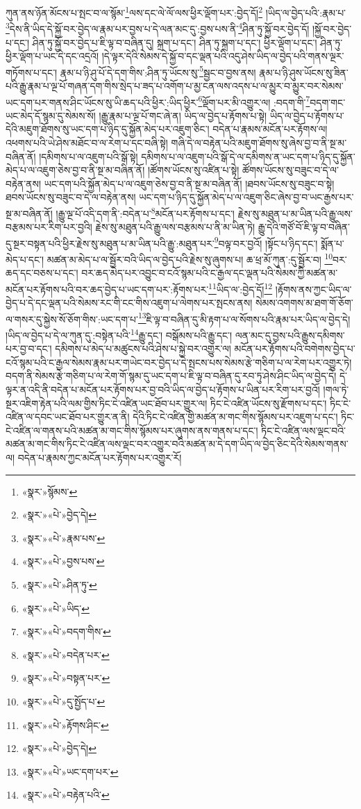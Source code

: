 ཀུན་ནས་ཉོན་མོངས་པ་སྤང་བ་ལ་སྙོམ་\footnote{«སྣར་»སྙོམས་}ལས་དང་ལེ་ལོ་ལས་ཕྱིར་ལྡོག་པར་:བྱེད་དོ།\footnote{«སྣར་»«པེ་»བྱེད་དེ།} །ཡིད་ལ་བྱེད་པའི་:རྣམ་པ་\footnote{«སྣར་»«པེ་»རྣམ་པས་}དེས་ནི་ཡིད་དེ་སྐྱོ་བར་བྱེད་ལ་རྣམ་པར་བྱས་པ་དེ་ལན་མང་དུ་:བྱས་པས་ནི་\footnote{«སྣར་»«པེ་»བྱས་པས་}ཤིན་ཏུ་སྐྱོ་བར་བྱེད་དོ། །སྐྱོ་བར་བྱེད་པ་དང་། ཤིན་ཏུ་སྐྱོ་བར་བྱེད་པ་ཇི་ལྟ་བ་བཞིན་དུ། སྐྲག་པ་དང་། ཤིན་ཏུ་སྐྲག་པ་དང་། ཕྱིར་ལྡོག་པ་དང་། ཤིན་ཏུ་ཕྱིར་ལྡོག་པ་ཡང་དེ་དང་འདྲའོ། །དེ་ལྟར་དེའི་སེམས་དེ་སྐྱོ་བ་དང་ལྡན་པའི་འདུ་ཤེས་ཡིད་ལ་བྱེད་པའི་གནས་ལྔར་གཏོགས་པ་དང་། རྣམ་པ་ཉི་ཤུ་པོ་དེ་དག་གིས་:ཤིན་ཏུ་ཡོངས་སུ་\footnote{«སྣར་»«པེ་»ཤིན་ཏུ་}སྦྱང་བ་བྱས་ནས། རྣམ་པ་ཉི་ཤུས་ཡོངས་སུ་ཟིན་པའི་རྒྱུ་རྣམ་པ་ལྔ་པོ་གཞན་དག་གིས་སྲེད་པ་ཟད་པ་འགོག་པ་མྱ་ངན་ལས་འདས་པ་ལ་མྱུར་བ་མྱུར་བར་སེམས་ཡང་དག་པར་གནས་ཤིང་ཡོངས་སུ་ཡི་ཆད་པའི་ཕྱིར་:ཡིད་ཕྱིར་\footnote{«སྣར་»«པེ་»ཡིད་}ལྡོག་པར་མི་འགྱུར་ལ། :བདག་གི་\footnote{«སྣར་»«པེ་»བདག་གིས་}བདག་གང་ཡང་མེད་དོ་སྙམ་དུ་སེམས་སོ། །རྒྱུ་རྣམ་པ་ལྔ་པོ་གང་ཞེ་ན། ཡིད་ལ་བྱེད་པ་རྟོགས་པ་སྟེ། ཡིད་ལ་བྱེད་པ་རྟོགས་པ་དེའི་མཇུག་ཐོགས་སུ་ཡང་དག་པ་ཉིད་དུ་སྐྱོན་མེད་པར་འཇུག་ཅིང་། བདེན་པ་རྣམས་མངོན་པར་རྟོགས་ལ། འཕགས་པའི་ཡེ་ཤེས་མཐོང་བ་ལ་རེག་པ་དང་བཞི་སྟེ། གཞི་དེ་ལ་བརྟེན་པའི་མཇུག་ཐོགས་སུ་ཞེས་བྱ་བ་ནི་སྔ་མ་བཞིན་ནོ། །དམིགས་པ་ལ་འཇུག་པའི་སྒོ་སྟེ། དམིགས་པ་ལ་འཇུག་པའི་སྒོ་དེ་ལ་དམིགས་ན་ཡང་དག་པ་ཉིད་དུ་སྐྱོན་མེད་པ་ལ་འཇུག་ཅེས་བྱ་བ་ནི་སྔ་མ་བཞིན་ནོ། །ཚོགས་ཡོངས་སུ་འཛིན་པ་སྟེ། ཚོགས་ཡོངས་སུ་བཟུང་བ་དེ་ལ་བརྟེན་ནས། ཡང་དག་པའི་སྐྱོན་མེད་པ་ལ་འཇུག་ཅེས་བྱ་བ་ནི་སྔ་མ་བཞིན་ནོ། །ཐབས་ཡོངས་སུ་བཟུང་བ་སྟེ། ཐབས་ཡོངས་སུ་བཟུང་བ་དེ་ལ་བརྟེན་ནས། ཡང་དག་པ་ཉིད་དུ་སྐྱོན་མེད་པ་ལ་འཇུག་ཅིང་ཞེས་བྱ་བ་ཡང་རྒྱས་པར་སྔ་མ་བཞིན་ནོ། །རྒྱུ་ལྔ་པོ་འདི་དག་ནི་:བདེན་པ་\footnote{«སྣར་»«པེ་»བདེན་པར་}མངོན་པར་རྟོགས་པ་དང་། རྗེས་སུ་མཐུན་པ་མ་ཡིན་པའི་རྒྱུ་ལས་བརྩམས་པར་རིག་པར་བྱའི། རྗེས་སུ་མཐུན་པའི་རྒྱུ་ལས་བརྩམས་པ་ནི་མ་ཡིན་ཏེ། རྒྱུ་དེའི་གཙོ་བོ་ཇི་ལྟ་བ་བཞིན་དུ་སྔར་བསྟན་པའི་ཕྱིར་རྗེས་སུ་མཐུན་པ་མ་ཡིན་པའི་རྒྱུ་:མཐུན་པར་\footnote{«སྣར་»«པེ་»བསྟན་པར་}བལྟ་བར་བྱའོ། །སྟོང་པ་ཉིད་དང་། སྨོན་པ་མེད་པ་དང་། མཚན་མ་མེད་པ་ལ་སྦྱོར་བའི་ཡིད་ལ་བྱེད་པའི་རྗེས་སུ་ཞུགས་པ། ཆ་ཕྲ་མོ་ཀུན་:དུ་སྦྱོར་བ། \footnote{«སྣར་»«པེ་»དུ་སྤྱོད་པ་}བར་ཆད་དང་བཅས་པ་དང་། བར་ཆད་མེད་པར་འབྱུང་བ་ངའོ་སྙམ་པའི་ང་རྒྱལ་དང་ལྡན་པའི་སེམས་ཀྱི་མཚན་མ་མངོན་པར་རྟོགས་པའི་བར་ཆད་བྱེད་པ་ཡང་དག་པར་:རྟོགས་པར་\footnote{«སྣར་»«པེ་»རྟོགས་ཤིང་}ཡིད་ལ་:བྱེད་དོ།\footnote{«སྣར་»«པེ་»བྱེད་དེ།} །རྟོགས་ནས་ཀྱང་ཡིད་ལ་བྱེད་པ་དེ་དང་ལྡན་པའི་སེམས་རང་གི་ངང་གིས་འཇུག་པ་ལེགས་པར་སྤངས་ནས། སེམས་འགགས་མ་ཐག་གོ་ཅོག་ལ་གསར་དུ་སྐྱེས་སོ་ཅོག་གིས་:ཡང་དག་པ་\footnote{«སྣར་»«པེ་»ཡང་དག་པར་}ཇི་ལྟ་བ་བཞིན་དུ་མི་རྟག་པ་ལ་སོགས་པའི་རྣམ་པར་ཡིད་ལ་བྱེད་དེ། །ཡིད་ལ་བྱེད་པ་དེ་ལ་ཀུན་དུ་:བསྟེན་པའི་\footnote{«སྣར་»«པེ་»བརྟེན་པའི་}རྒྱུ་དང་། བསྒོམས་པའི་རྒྱུ་དང་། ལན་མང་དུ་བྱས་པའི་རྒྱུས་དམིགས་པར་བྱ་བ་དང་། དམིགས་པ་མེད་པ་མཚུངས་པའི་ཤེས་པ་སྐྱེ་བར་འགྱུར་ལ། མངོན་པར་རྟོགས་པའི་བགེགས་བྱེད་པ་ངའོ་སྙམ་པའི་ང་རྒྱལ་སེམས་རྣམ་པར་གཡེང་བར་བྱེད་པ་དེ་སྤངས་པས་སེམས་རྩེ་གཅིག་པ་ལ་རེག་པར་འགྱུར་ཏེ། བདག་ནི་སེམས་རྩེ་གཅིག་པ་ལ་རེག་གོ་སྙམ་དུ་ཡང་དག་པ་ཇི་ལྟ་བ་བཞིན་དུ་རབ་ཏུ་ཤེས་ཤིང་ཡིད་ལ་བྱེད་དེ། དེ་ལྟར་ན་འདི་ནི་བདེན་པ་མངོན་པར་རྟོགས་པར་བྱ་བའི་ཡིད་ལ་བྱེད་པ་རྟོགས་པ་ཡིན་པར་རིག་པར་བྱའོ། །གལ་ཏེ་སྔར་འཇིག་རྟེན་པའི་ལམ་གྱིས་ཏིང་ངེ་འཛིན་ཡང་ཐོབ་པར་གྱུར་ལ། ཏིང་ངེ་འཛིན་ཡོངས་སུ་རྫོགས་པ་དང་། ཏིང་ངེ་འཛིན་ལ་དབང་ཡང་ཐོབ་པར་གྱུར་ན་ནི། དེའི་ཏིང་ངེ་འཛིན་གྱི་མཚན་མ་གང་གིས་སྙོམས་པར་འཇུག་པ་དང་། ཏིང་ངེ་འཛིན་ལ་གནས་པའི་མཚན་མ་གང་གིས་སྙོམས་པར་ཞུགས་ནས་གནས་པ་དང་། ཏིང་ངེ་འཛིན་ལས་ལྡང་བའི་མཚན་མ་གང་གིས་ཏིང་ངེ་འཛིན་ལས་ལྡང་བར་འགྱུར་བའི་མཚན་མ་དེ་དག་ཡིད་ལ་བྱེད་ཅིང་དེའི་སེམས་གནས་ལ། བདེན་པ་རྣམས་ཀྱང་མངོན་པར་རྟོགས་པར་འགྱུར་རོ། 